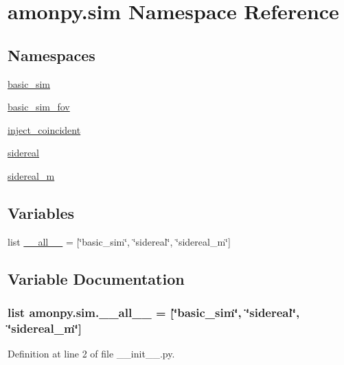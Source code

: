 \hypertarget{namespaceamonpy_1_1sim}{\section{amonpy.\-sim Namespace Reference}
\label{namespaceamonpy_1_1sim}
}
\subsection*{Namespaces}
\begin{DoxyCompactItemize}
\item 
\hyperlink{namespaceamonpy_1_1sim_1_1basic__sim}{basic\-\_\-sim}
\item 
\hyperlink{namespaceamonpy_1_1sim_1_1basic__sim__fov}{basic\-\_\-sim\-\_\-fov}
\item 
\hyperlink{namespaceamonpy_1_1sim_1_1inject__coincident}{inject\-\_\-coincident}
\item 
\hyperlink{namespaceamonpy_1_1sim_1_1sidereal}{sidereal}
\item 
\hyperlink{namespaceamonpy_1_1sim_1_1sidereal__m}{sidereal\-\_\-m}
\end{DoxyCompactItemize}
\subsection*{Variables}
\begin{DoxyCompactItemize}
\item 
list \hyperlink{namespaceamonpy_1_1sim_a88c074ad5a5920622371de9472a7290b}{\-\_\-\-\_\-all\-\_\-\-\_\-} = \mbox{[}\char`\"{}basic\-\_\-sim\char`\"{}, \char`\"{}sidereal\char`\"{}, \char`\"{}sidereal\-\_\-m\char`\"{}\mbox{]}
\end{DoxyCompactItemize}


\subsection{Variable Documentation}
\hypertarget{namespaceamonpy_1_1sim_a88c074ad5a5920622371de9472a7290b}{
\subsubsection[{\-\_\-\-\_\-all\-\_\-\-\_\-}]{\setlength{\rightskip}{0pt plus 5cm}list amonpy.\-sim.\-\_\-\-\_\-all\-\_\-\-\_\- = \mbox{[}\char`\"{}basic\-\_\-sim\char`\"{}, \char`\"{}sidereal\char`\"{}, \char`\"{}sidereal\-\_\-m\char`\"{}\mbox{]}}}\label{namespaceamonpy_1_1sim_a88c074ad5a5920622371de9472a7290b}


Definition at line 2 of file \-\_\-\-\_\-init\-\_\-\-\_\-.\-py.

